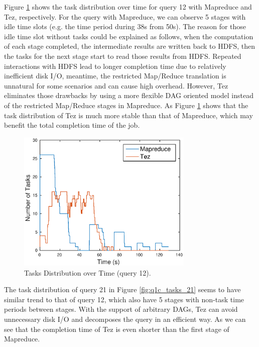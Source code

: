 \documentclass[10pt]{article}
\begin{document}
Figure \ref{fig:q1c_tasks_12} shows the task distribution over time for query 12 with Mapreduce and Tez, respectively. For the query with Mapreduce, we can observe 5 stages with idle time slots (e.g. the time period during 38s from 50s). The reason for those idle time slot without tasks could be explained as follows, when the computation of each stage completed, the intermediate results are written back to HDFS, then the tasks for the next stage start to read those results from HDFS. Repeated interactions with HDFS lead to longer completion time due to relatively inefficient disk I/O, meantime, the restricted Map/Reduce translation is unnatural for some scenarios and can cause high overhead. However, Tez eliminates those drawbacks by using a more flexible DAG oriented model instead of the restricted Map/Reduce stages in Mapreduce. As Figure \ref{fig:q1c_tasks_12} shows that the task distribution of Tez is much more stable than that of Mapreduce, which may benefit the total completion time of the job.

\begin{figure}
\begin{center}
\includegraphics[width=0.75\textwidth]{pic/q1c_task_distribution_12}
\caption{Tasks Distribution over Time (query 12).}
\label{fig:q1c_tasks_12}
\end{center}
\end{figure}

The task distribution of query 21 in Figure \ref{fig:q1c_tasks_21} seems to have similar trend to that of query 12, which also have 5 stages with non-task time periods between stages. With the support of arbitrary DAGs, Tez can avoid unnecessary disk I/O and decomposes the query in an efficient way. As we can see that the completion time of Tez is even shorter than the first stage of Mapreduce.
\end{document}
